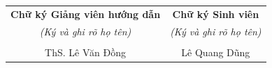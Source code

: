 \newpage
\thispagestyle{empty} %
\mbox{} %
\newpage

\begin{titlepage}
    \thispagestyle{empty} %

    \vspace*{3cm} %

    \begin{table}[h]
        \centering
        \begin{tabular}{c c}
            \textbf{Chữ ký Giảng viên hướng dẫn} \hspace{1.5cm} & \hspace{1.5cm} \textbf{Chữ ký Sinh viên} \\
            \textit{(Ký và ghi rõ họ tên)} & \textit{(Ký và ghi rõ họ tên)} \\
            \\[2.5cm] %
            ThS. Lê Văn Đồng & Lê Quang Dũng \\
        \end{tabular}
    \end{table}

\end{titlepage}
